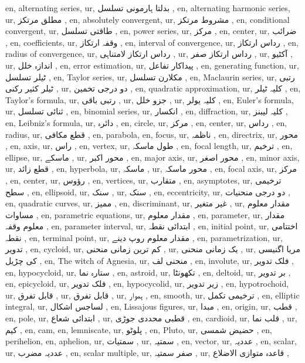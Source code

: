 en, alternating series,
ur, بدلتا ہارمونی تسلسل ,
en, alternating harmonic series,
ur, مطلق مرتکز ,
en, absolutely convergent,
ur, مشروط مرتکز ,
en, conditional convergent,
ur, طاقتی تسلسل ,
en, power series,
ur, مرکز ,
en, center,
ur, ضرائب  ,
en, coefficients,
ur, وقفہ ارتکاز ,
en, interval of convergence,
ur, رداس ارتکاز ,
en, radius of convergence,
ur, رداس ارتکاز لامتناہی ,
ur, رداس ارتکاز صفر ,
ur, آکٹیو ,
ur, اندازہ خلل ,
en, error estimation,
ur, پیداکار تفاعل  ,
en, generating function,
ur, ٹیلر تسلسل ,
en, Taylor series,
ur, مکلارن تسلسل ,
en, Maclaurin series,
ur,  رتبی ٹیلر کثیر رکنی ,
ur, دو درجی تخمین ,
en, quadratic approximation,
ur, کلیہ ٹیلر ,
en, Taylor's formula,
ur,  رتبی باقی ,
ur, جزو خلل ,
ur, کلیہ یولر ,
en, Euler's formula,
ur, ثنائی تسلسل ,
en, binomial series,
ur, انکسار  ,
en, diffraction,
ur, کلیہ لیبنز ,
en, Leibniz's formula,
ur, دائرہ ,
en, circle,
ur, مرکز ,
en, center,
ur, رداس ,
en, radius,
ur, قطع مکافی ,
en, parabola,
en, focus,
ur, ناظمہ ,
en, directrix,
ur, محور ,
en, axis,
ur, راس ,
en, vertex,
ur, طول ماسکہ ,
en, focal length,
ur, ترخیم ,
en, ellipse,
ur, ماسکے ,
ur, محور اکبر ,
en, major axis,
ur, محور اصغر ,
en, minor axis,
ur, قطع زائد ,
en, hyperbola,
ur, ماسکہ ,
ur, محور ماسکہ ,
en, focal axis,
ur, مرکز ,
en, center,
ur, رؤوس ,
en, vertices,
ur, متقارب ,
en, asymptotes,
ur, ترخیمی سطح ,
en, ellipsoid,
ur, سنک ,
ur, سنک ,
en, eccentricity,
ur, دو درجی منحنیات ,
en, quadratic curves,
ur, ممیز ,
en, discriminant,
ur, غیر متغیر ,
ur, مقدار معلوم مساوات ,
en, parametric equations,
ur, مقدار معلوم ,
en, parameter,
ur, مقدار معلوم وقفہ ,
en, parameter interval,
ur, ابتدائی نقطہ ,
en, initial point,
ur, اختتامی نقطہ ,
en, terminal point,
ur, مقدار معلوم روپ دینے ,
en, parametrization,
ur, تدویر ,
en, cycloid,
ur, کم ترین زمانی منحنی ,
ur, یک زمانی منحنی ,
ur, مریا اگنیسی کی چڑیل  ,
en, The witch of Agnesia,
ur, منحنی لف ,
en, involute,
ur, فلک تدویر ,
en, hypocycloid,
ur, ستارہ نما ,
en, astroid,
ur, تکھونٹا ,
en, deltoid,
ur, بر تدویر ,
en, epicycloid,
ur, فلک تدویر ,
en, hypocycolid,
ur, زیر تدویر ,
en, hypotrochoid,
ur, قابل تفرق ,
ur, قابل تفرق ,
ur, ہموار ,
en, smooth,
ur, ترخیمی تکمل ,
en, elliptic integral,
ur, لساجس اشکال ,
en, Lissajous figures,
ur, مبدا ,
en, origin,
ur, قطب ,
en, pole,
ur, ابتدائی شعاع ,
ur, قطبی محددی جوڑی ,
en, cardioid,
ur, قلب نما ,
ur, کیم ,
en, cam,
en, lemniscate,
ur, پلوٹو  ,
en, Pluto,
ur, حضیض شمسی ,
en, perihelion,
en, aphelion,
ur, سمتیات ,
ur, سمتیہ ,
en, vector,
ur, عددیہ ,
en, scalar,
ur, عددیہ مضرب ,
en, scalar multiple,
ur, صفر سمتیہ ,
ur, قاعدہ متوازی الاضلاع ,
